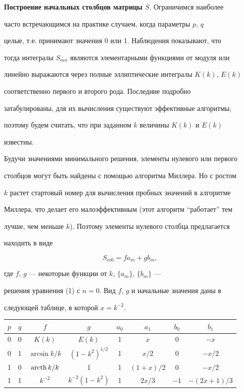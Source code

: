 {\bf Построение начальных столбцов матрицы $S$}. Ограничимся наиболее 


часто встречающимся на практике случаем, когда параметры $p$, $q$ 


целые, т.е. принимают значения 0 или 1. Наблюдения показывают, что 


тогда интегралы $S_{mn}$ являются элементарными функциями от модуля или 


линейно выражаются через полные эллиптические интегралы $K(k)$, $E(k)$ 


соответственно первого и второго рода. Последние подробно 


затабулированы, для их вычисления существуют эффективные алгоритмы, 


поэтому будем считать, что при заданном $k$ величины $K(k)$ и $E(k)$ 


известны. 


 


Будучи значениями минимального решения, элементы нулевого или первого 


столбцов могут быть найдены с помощью алгоритма Миллера. Но с ростом 


$k$ растет стартовый номер для вычисления пробных значений в алгоритме 


Миллера, что делает его малоэффективным (этот алгоритм ``работает'' тем 


лучше, чем меньше $k$). Поэтому элементы нулевого столбца предлагается 


находить в виде 


\begin{equation} 


S_{m0}=f a_m+g b_m, 


\end{equation} 


где $f$, $g$ --- некоторые функции от $k$, $\{a_m\}$, $\{b_m\}$ --- 


решения уравнения (1) с $n=0$. Вид $f$, $g$ и начальные значения даны в 


следующей таблице, в которой $x=k^{-2}$. 


\begin{center} 


\begin{tabular}{c|c|c|c|c|c|c|c} 


$p$ & $q$ & $f$ & $g$ & $a_0$ & $a_1$ & $b_0$ & $b_1$ \\ 


\hline 


0 & 0 & $K(k)$ & $E(k)$ & 1 & $x$ & 0 & $-x$ \\ 


0 & 1 & $\arcsin k/k$ & $(1-k^2)^{1/2}$ & 1 & $x/2$ & 0 & $-x/2$ \\ 


1 & 0 & $\text{arcth\,}k/k$ & 1 & 1 & $(1+x)/2$ & 0 & $-x/2$ \\ 


1 & 1 & $k^{-2}$ & $k^{-2}(1-k^2)$ & 1 & $2x/3$ & $-1$ & $-(2x+1)/3$


\end{tabular} 


\end{center} 


